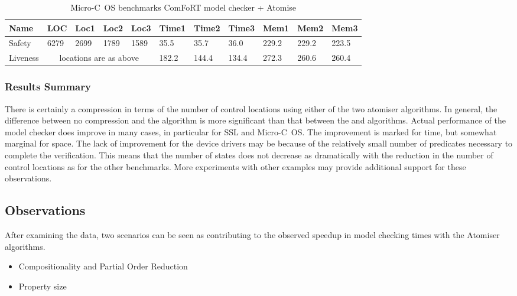 \begin{table}
\begin{scriptsize}
\begin{tabular}{|l|l|l|l|l|l|l|l|l|l|l|} \hline
Name & LOC & Loc1 & Loc2 & Loc3 & Time1 & Time2 & Time3 & Mem1 & Mem2
& Mem3 \\ \hline
Safety & 6279 & 2699 & 1789 & 1589 & 35.5 & 35.7 & 36.0 & 229.2 &
229.2 & 223.5 \\ \hline
Liveness & \multicolumn{4}{|c|}{locations are as above} & 182.2 & 144.4 & 134.4 & 272.3 &
260.6 & 260.4 \\ \hline
\end{tabular}
\label{microc}
\caption{Micro-C~OS benchmarks ComFoRT model checker + Atomise}
\end{scriptsize}
\end{table}

\subsubsection{Results Summary}


There is certainly a compression in terms of the number of control
locations using either of the two atomiser algorithms. In general, the
difference between no compression and the \atomizer{} algorithm is
more significant than that between the \atomizer{} and \catomizer{}
algorithms. Actual performance of the model checker does improve in
many cases, in particular for SSL and Micro-C~OS. The improvement is
marked for time, but somewhat marginal for space. The lack of
improvement for the device drivers may be because of the relatively
small number of predicates necessary to complete the
verification. This means that the number of states does not decrease
as dramatically with the reduction in the number of control locations
as for the other benchmarks. More experiments with other examples may
provide additional support for these observations.

\subsection{Observations}

After examining the data, two scenarios can be seen as contributing to
the observed speedup in model checking times with the Atomiser
algorithms.

\begin{itemize}

\item Compositionality and Partial Order Reduction

\item Property size

\end{itemize}

